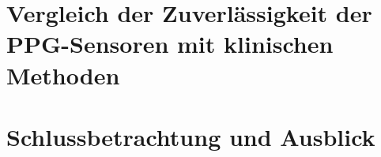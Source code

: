\documentclass[10pt,a4paper,headinclude,twoside, plainheadsepline, open=right, numbers=noenddot, twocolumn]{article}
\begin{document}
\section{Vergleich der Zuverlässigkeit der PPG-Sensoren mit klinischen Methoden}
\label{vergleich der verfahren}

\section{Schlussbetrachtung und Ausblick}
\label{schlussbetrachtung und ausblick}


%
\printbibliography
\end{document}
